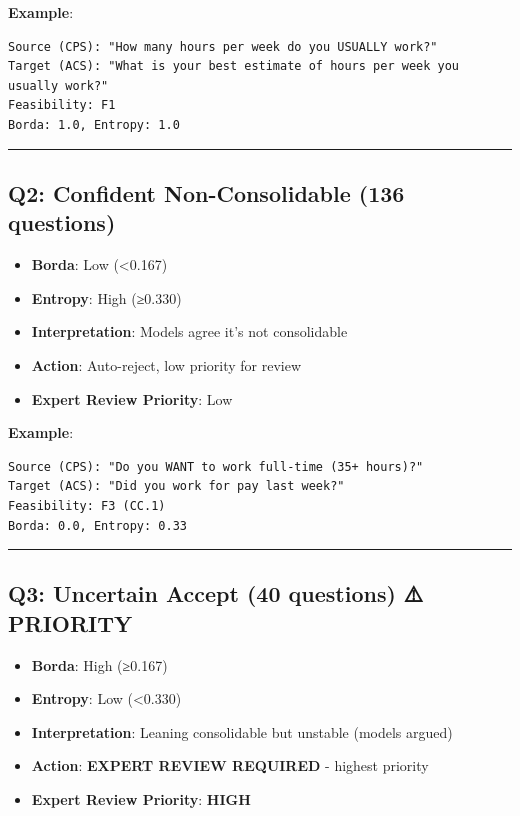 \documentclass[
  letterpaper,
]{report}
\providecommand{\tightlist}{%
  \setlength{\itemsep}{0pt}\setlength{\parskip}{0pt}}
\begin{document}
\textbf{Example}:

\begin{verbatim}
Source (CPS): "How many hours per week do you USUALLY work?"
Target (ACS): "What is your best estimate of hours per week you usually work?"
Feasibility: F1
Borda: 1.0, Entropy: 1.0
\end{verbatim}

\begin{center}\rule{0.5\linewidth}{0.5pt}\end{center}

\subsection{Q2: Confident Non-Consolidable (136
questions)}\label{q2-confident-non-consolidable-136-questions}

\begin{itemize}
\tightlist
\item
  \textbf{Borda}: Low (\textless0.167)
\item
  \textbf{Entropy}: High (≥0.330)
\item
  \textbf{Interpretation}: Models agree it's not consolidable
\item
  \textbf{Action}: Auto-reject, low priority for review
\item
  \textbf{Expert Review Priority}: Low
\end{itemize}

\textbf{Example}:

\begin{verbatim}
Source (CPS): "Do you WANT to work full-time (35+ hours)?"
Target (ACS): "Did you work for pay last week?"
Feasibility: F3 (CC.1)
Borda: 0.0, Entropy: 0.33
\end{verbatim}

\begin{center}\rule{0.5\linewidth}{0.5pt}\end{center}

\subsection{Q3: Uncertain Accept (40 questions) ⚠️
PRIORITY}\label{q3-uncertain-accept-40-questions-priority}

\begin{itemize}
\tightlist
\item
  \textbf{Borda}: High (≥0.167)
\item
  \textbf{Entropy}: Low (\textless0.330)
\item
  \textbf{Interpretation}: Leaning consolidable but unstable (models
  argued)
\item
  \textbf{Action}: \textbf{EXPERT REVIEW REQUIRED} - highest priority
\item
  \textbf{Expert Review Priority}: \textbf{HIGH}
\end{itemize}
\end{document}

